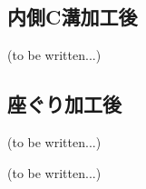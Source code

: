 \subsection{内側C溝加工後\TBW}
(to be written...)


\subsection{座ぐり加工後\TBW}
(to be written...)



\clearpage
(to be written...)

